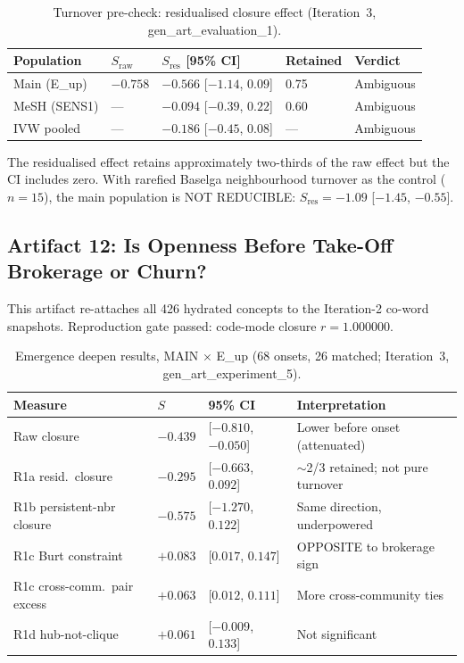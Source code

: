 \documentclass[11pt,letterpaper]{article}
\begin{document}
\begin{table}[!htbp]
\centering
\caption{Turnover pre-check: residualised closure effect (Iteration~3, gen\_art\_evaluation\_1).}
\label{tab:turnover}
\begin{tabular}{L{2.5cm}R{1.3cm}R{1.8cm}R{2cm}L{2.5cm}}
\toprule
Population & $S_{\mathrm{raw}}$ & $S_{\mathrm{res}}$ [95\% CI] & Retained & Verdict \\
\midrule
Main (E\_up) & $-0.758$ & $-0.566$ [$-1.14$, $0.09$] & 0.75 & Ambiguous \\
MeSH (SENS1) & --- & $-0.094$ [$-0.39$, $0.22$] & 0.60 & Ambiguous \\
IVW pooled & --- & $-0.186$ [$-0.45$, $0.08$] & --- & Ambiguous \\
\bottomrule
\end{tabular}
\end{table}

The residualised effect retains approximately two-thirds of the raw effect but the CI includes zero. With rarefied Baselga neighbourhood turnover as the control ($n = 15$), the main population is NOT REDUCIBLE: $S_{\mathrm{res}} = -1.09$ [$-1.45$, $-0.55$].

\subsection{Artifact 12: Is Openness Before Take-Off Brokerage or Churn?}

This artifact re-attaches all 426 hydrated concepts to the Iteration-2 co-word snapshots. Reproduction gate passed: code-mode closure $r = 1.000000$.

\begin{table}[!htbp]
\centering
\caption{Emergence deepen results, MAIN $\times$ E\_up (68 onsets, 26 matched; Iteration~3, gen\_art\_experiment\_5).}
\label{tab:emergence_deepen}
\begin{tabular}{L{3.5cm}R{1.3cm}L{3cm}L{3.5cm}}
\toprule
Measure & $S$ & 95\% CI & Interpretation \\
\midrule
Raw closure & $-0.439$ & [$-0.810$, $-0.050$] & Lower before onset (attenuated) \\
R1a resid.\ closure & $-0.295$ & [$-0.663$, $0.092$] & ${\sim}$2/3 retained; not pure turnover \\
R1b persistent-nbr closure & $-0.575$ & [$-1.270$, $0.122$] & Same direction, underpowered \\
R1c Burt constraint & $+0.083$ & [$0.017$, $0.147$] & OPPOSITE to brokerage sign \\
R1c cross-comm.\ pair excess & $+0.063$ & [$0.012$, $0.111$] & More cross-community ties \\
R1d hub-not-clique & $+0.061$ & [$-0.009$, $0.133$] & Not significant \\
\bottomrule
\end{tabular}
\end{table}
\end{document}
